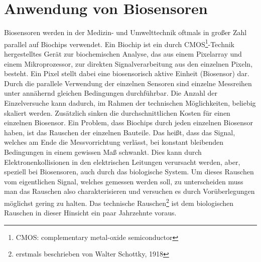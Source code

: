 \section{Anwendung von Biosensoren}
Biosensoren werden in der Medizin- und Umwelttechnik oftmals in großer Zahl parallel auf Biochips verwendet. %
Ein Biochip ist ein durch CMOS\footnote{CMOS: complementary metal-oxide semiconductor}-Technik hergestelltes Gerät zur biochemischen Analyse, das aus einem Pixelarray und einem Mikroprozessor, zur direkten Signalverarbeitung aus den einzelnen Pixeln, besteht. Ein Pixel stellt dabei eine biosensorisch aktive Einheit (Biosensor) dar.
Durch die parallele Verwendung der einzelnen Sensoren sind einzelne Messreihen unter annähernd gleichen Bedingungen durchführbar. Die Anzahl der Einzelversuche kann dadurch, im Rahmen der technischen Möglichkeiten, beliebig skaliert werden. Zusätzlich sinken die durchschnittlichen Kosten für einen einzelnen Biosensor.\cite{CMOSBio}
Ein Problem, dass Biochips durch jeden einzelnen Biosensor haben, ist das Rauschen der einzelnen Bauteile. Das heißt, dass das Signal, welches am Ende die Messvorrichtung verlässt, bei konstant bleibenden Bedingungen in einem gewissen Maß schwankt. Dies kann durch Elektronenkollisionen in den elektrischen Leitungen verursacht werden, aber, speziell bei Biosensoren, auch durch das biologische System.
Um dieses Rauschen vom eigentlichen Signal, welches gemessen werden soll, zu unterscheiden muss man das Rauschen also charakterisieren und versuchen es durch Vorüberlegungen möglichst gering zu halten. Das technische Rauschen\footnote{erstmals beschrieben von Walter Schottky, 1918\cite{Schottky1918}} ist dem biologischen Rauschen in dieser Hinsicht ein paar Jahrzehnte voraus.
